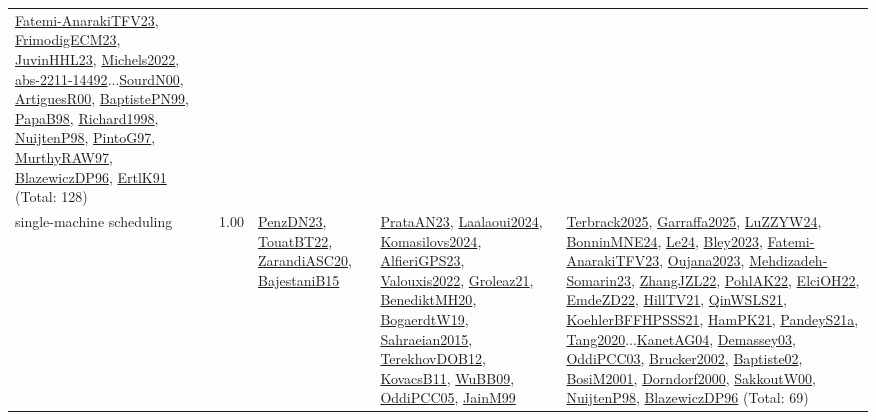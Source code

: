 {\begin{longtable}{p{3cm}r>{\raggedright\arraybackslash}p{6cm}>{\raggedright\arraybackslash}p{6cm}>{\raggedright\arraybackslash}p{8cm}}
\hyperref[detail:Fatemi-AnarakiTFV23]{Fatemi-AnarakiTFV23}, \hyperref[detail:FrimodigECM23]{FrimodigECM23}, \hyperref[detail:JuvinHHL23]{JuvinHHL23}, \hyperref[detail:Michels2022]{Michels2022}, \hyperref[detail:abs-2211-14492]{abs-2211-14492}...\hyperref[detail:SourdN00]{SourdN00}, \hyperref[detail:ArtiguesR00]{ArtiguesR00}, \hyperref[detail:BaptistePN99]{BaptistePN99}, \hyperref[detail:PapaB98]{PapaB98}, \hyperref[detail:Richard1998]{Richard1998}, \hyperref[detail:NuijtenP98]{NuijtenP98}, \hyperref[detail:PintoG97]{PintoG97}, \hyperref[detail:MurthyRAW97]{MurthyRAW97}, \hyperref[detail:BlazewiczDP96]{BlazewiczDP96}, \hyperref[detail:ErtlK91]{ErtlK91} (Total: 128)\\
\index{single-machine scheduling}\index{Concepts!single-machine scheduling}single-machine scheduling &  1.00 & \hyperref[detail:PenzDN23]{PenzDN23}, \hyperref[detail:TouatBT22]{TouatBT22}, \hyperref[detail:ZarandiASC20]{ZarandiASC20}, \hyperref[detail:BajestaniB15]{BajestaniB15} & \hyperref[detail:PrataAN23]{PrataAN23}, \hyperref[detail:Laalaoui2024]{Laalaoui2024}, \hyperref[detail:Komasilovs2024]{Komasilovs2024}, \hyperref[detail:AlfieriGPS23]{AlfieriGPS23}, \hyperref[detail:Valouxis2022]{Valouxis2022}, \hyperref[detail:Groleaz21]{Groleaz21}, \hyperref[detail:BenediktMH20]{BenediktMH20}, \hyperref[detail:BogaerdtW19]{BogaerdtW19}, \hyperref[detail:Sahraeian2015]{Sahraeian2015}, \hyperref[detail:TerekhovDOB12]{TerekhovDOB12}, \hyperref[detail:KovacsB11]{KovacsB11}, \hyperref[detail:WuBB09]{WuBB09}, \hyperref[detail:OddiPCC05]{OddiPCC05}, \hyperref[detail:JainM99]{JainM99} & \hyperref[detail:Terbrack2025]{Terbrack2025}, \hyperref[detail:Garraffa2025]{Garraffa2025}, \hyperref[detail:LuZZYW24]{LuZZYW24}, \hyperref[detail:BonninMNE24]{BonninMNE24}, \hyperref[detail:Le24]{Le24}, \hyperref[detail:Bley2023]{Bley2023}, \hyperref[detail:Fatemi-AnarakiTFV23]{Fatemi-AnarakiTFV23}, \hyperref[detail:Oujana2023]{Oujana2023}, \hyperref[detail:Mehdizadeh-Somarin23]{Mehdizadeh-Somarin23}, \hyperref[detail:ZhangJZL22]{ZhangJZL22}, \hyperref[detail:PohlAK22]{PohlAK22}, \hyperref[detail:ElciOH22]{ElciOH22}, \hyperref[detail:EmdeZD22]{EmdeZD22}, \hyperref[detail:HillTV21]{HillTV21}, \hyperref[detail:QinWSLS21]{QinWSLS21}, \hyperref[detail:KoehlerBFFHPSSS21]{KoehlerBFFHPSSS21}, \hyperref[detail:HamPK21]{HamPK21}, \hyperref[detail:PandeyS21a]{PandeyS21a}, \hyperref[detail:Tang2020]{Tang2020}...\hyperref[detail:KanetAG04]{KanetAG04}, \hyperref[detail:Demassey03]{Demassey03}, \hyperref[detail:OddiPCC03]{OddiPCC03}, \hyperref[detail:Brucker2002]{Brucker2002}, \hyperref[detail:Baptiste02]{Baptiste02}, \hyperref[detail:BosiM2001]{BosiM2001}, \hyperref[detail:Dorndorf2000]{Dorndorf2000}, \hyperref[detail:SakkoutW00]{SakkoutW00}, \hyperref[detail:NuijtenP98]{NuijtenP98}, \hyperref[detail:BlazewiczDP96]{BlazewiczDP96} (Total: 69)\\

\end{longtable}}
